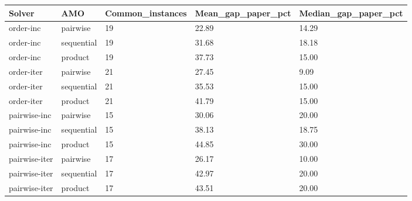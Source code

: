 \begin{tabular}{lllll}
\hline
Solver & AMO & Common\_instances & Mean\_gap\_paper\_pct & Median\_gap\_paper\_pct \\
\hline
order-inc & pairwise & 19 & 22.89 & 14.29 \\
order-inc & sequential & 19 & 31.68 & 18.18 \\
order-inc & product & 19 & 37.73 & 15.00 \\
order-iter & pairwise & 21 & 27.45 & 9.09 \\
order-iter & sequential & 21 & 35.53 & 15.00 \\
order-iter & product & 21 & 41.79 & 15.00 \\
pairwise-inc & pairwise & 15 & 30.06 & 20.00 \\
pairwise-inc & sequential & 15 & 38.13 & 18.75 \\
pairwise-inc & product & 15 & 44.85 & 30.00 \\
pairwise-iter & pairwise & 17 & 26.17 & 10.00 \\
pairwise-iter & sequential & 17 & 42.97 & 20.00 \\
pairwise-iter & product & 17 & 43.51 & 20.00 \\
\hline
\end{tabular}
